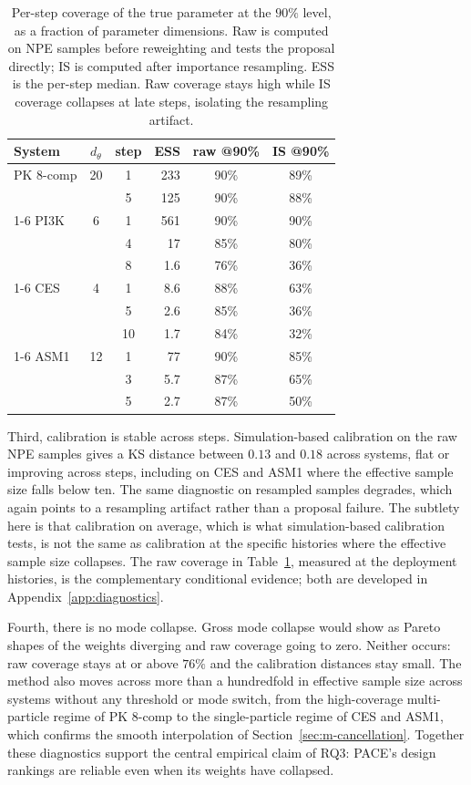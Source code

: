 \begin{table}[t]
\centering\small
\caption[Raw versus resampled coverage]{Per-step coverage of the true parameter at the
$90\%$ level, as a fraction of parameter dimensions. Raw is computed on NPE samples
before reweighting and tests the proposal directly; IS is computed after importance
resampling. ESS is the per-step median. Raw coverage stays high while IS coverage
collapses at late steps, isolating the resampling artifact.}
\label{tab:coverage}
\begin{tabular}{lccrcc}
\toprule
System & $d_\theta$ & step & ESS & raw @90\% & IS @90\% \\
\midrule
PK 8-comp & 20 & 1 & 233 & 90\% & 89\% \\
          &    & 5 & 125 & 90\% & 88\% \\
\cmidrule(l){1-6}
PI3K & 6 & 1 & 561 & 90\% & 90\% \\
     &   & 4 & 17 & 85\% & 80\% \\
     &   & 8 & 1.6 & 76\% & 36\% \\
\cmidrule(l){1-6}
CES & 4 & 1 & 8.6 & 88\% & 63\% \\
    &   & 5 & 2.6 & 85\% & 36\% \\
    &   & 10 & 1.7 & 84\% & 32\% \\
\cmidrule(l){1-6}
ASM1 & 12 & 1 & 77 & 90\% & 85\% \\
     &    & 3 & 5.7 & 87\% & 65\% \\
     &    & 5 & 2.7 & 87\% & 50\% \\
\bottomrule
\end{tabular}
\end{table}

Third, calibration is stable across steps. Simulation-based calibration on the raw NPE
samples gives a KS distance between $0.13$ and $0.18$ across systems, flat or improving
across steps, including on CES and ASM1 where the effective sample size falls below ten.
The same diagnostic on resampled samples degrades, which again points to a resampling
artifact rather than a proposal failure. The subtlety here is that calibration on
average, which is what simulation-based calibration tests, is not the same as
calibration at the specific histories where the effective sample size collapses. The
raw coverage in Table~\ref{tab:coverage}, measured at the deployment histories, is the
complementary conditional evidence; both are developed in Appendix~\ref{app:diagnostics}.

Fourth, there is no mode collapse. Gross mode collapse would show as Pareto shapes of
the weights diverging and raw coverage going to zero. Neither occurs: raw coverage
stays at or above $76\%$ and the calibration distances stay small. The method also
moves across more than a hundredfold in effective sample size across systems without
any threshold or mode switch, from the high-coverage multi-particle regime of PK 8-comp
to the single-particle regime of CES and ASM1, which confirms the smooth interpolation
of Section~\ref{sec:m-cancellation}. Together these diagnostics support the central
empirical claim of RQ3: PACE's design rankings are reliable even when its weights have
collapsed.

